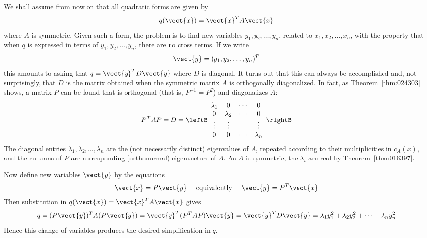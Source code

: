 We shall assume from now on that all quadratic forms are given by
\begin{equation*}
q(\vect{x}) = \vect{x}^TA\vect{x}
\end{equation*}
where $A$ is symmetric. Given such a form, the problem is to find new variables $y_{1}, y_{2}, \dots, y_{n}$, related to $x_{1}, x_{2}, \dots, x_{n}$, with the property that when $q$ is expressed in terms of $y_{1}, y_{2}, \dots, y_{n}$, there are no cross terms. If we write
\begin{equation*}
\vect{y} = (y_{1}, y_{2}, \dots, y_{n})^T
\end{equation*}
this amounts to asking that $q = \vect{y}^{T}D\vect{y}$ where $D$ is diagonal. It turns out that this can always be accomplished and, not surprisingly, that $D$ is the matrix obtained when the symmetric matrix $A$ is orthogonally diagonalized. In fact, as Theorem~\ref{thm:024303} shows, a matrix $P$ can be found that is orthogonal (that is, $P^{-1} = P^{T}$) and diagonalizes $A$:
\begin{equation*}
P^TAP = D = \leftB \begin{array}{cccc}
\lambda_{1} & 0 & \cdots & 0 \\
0 & \lambda_{2} & \cdots & 0 \\
\vdots & \vdots && \vdots \\
0 & 0 & \cdots & \lambda_{n}
\end{array}\rightB
\end{equation*}
The diagonal entries $\lambda_{1}, \lambda_{2}, \dots, \lambda_{n}$ are the (not necessarily distinct) eigenvalues of $A$, repeated according to their multiplicities in $c_{A}(x)$, and the columns of $P$ are corresponding (orthonormal) eigenvectors of $A$. As $A$ is symmetric, the $\lambda_{i}$ are real by Theorem~\ref{thm:016397}.


Now define new variables $\vect{y}$ by the equations
\begin{equation*}
\vect{x} = P\vect{y} \quad \mbox{ equivalently } \quad \vect{y} = P^T\vect{x}
\end{equation*}
Then substitution in $q(\vect{x}) = \vect{x}^{T}A\vect{x}$ gives
\begin{equation*}
q = (P\vect{y})^TA(P\vect{y}) = \vect{y}^T(P^TAP)\vect{y} = \vect{y}^TD\vect{y} = \lambda_{1}y_{1}^2 + \lambda_{2}y_{2}^2 + \cdots + \lambda_{n}y_{n}^2
\end{equation*}
Hence this change of variables produces the desired simplification in $q$.


